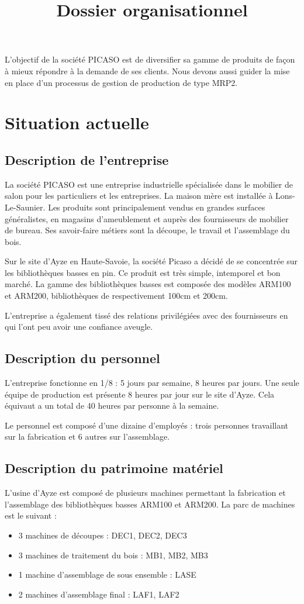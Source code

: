 \documentclass[a4paper]{../TPInsa}
\title{Dossier organisationnel}
\begin{document}
	\pageTitre
	\tableMatieres

		L'objectif de la société PICASO est de diversifier sa gamme de produits de façon à mieux répondre à la demande de ses clients. Nous devons aussi guider la mise en place d'un processus de gestion de production de type MRP2.	
	
	\section{Situation actuelle}
	
	\subsection{Description de l'entreprise}
	
	La société PICASO est une entreprise industrielle spécialisée dans le mobilier de salon pour les particuliers et les entreprises. La maison mère est installée à Lons-Le-Saunier. Les produits sont principalement vendus en grandes surfaces généralistes, en magasins d'ameublement et auprès des fournisseurs de mobilier de bureau. Ses savoir-faire métiers sont la découpe, le travail et l'assemblage du bois.
	
	Sur le site d'Ayze en Haute-Savoie, la société Picaso a décidé de se concentrée sur les bibliothèques basses en pin. Ce produit est très simple, intemporel et bon marché. La gamme des bibliothèques basses est composée des modèles ARM100 et ARM200, bibliothèques de respectivement 100cm et 200cm.  
	
	
	L'entreprise a également tissé des relations privilégiées avec des fournisseurs en qui l'ont peu avoir une confiance aveugle. 
	
	\subsection{Description du personnel}
	L'entreprise fonctionne en 1/8 : 5 jours par semaine, 8 heures par jours. Une seule équipe de production est présente 8 heures par jour sur le site d'Ayze. Cela équivaut a un total de 40 heures par personne à la semaine. 
	
	Le personnel est composé d'une dizaine d'employés : trois personnes travaillant sur la fabrication et 6 autres sur l'assemblage. 
	\subsection{Description du patrimoine matériel}
	L'usine d'Ayze est composé de plusieurs machines permettant la fabrication et l'assemblage des bibliothèques basses ARM100 et ARM200. 
	La parc de machines est le suivant :
	\begin{itemize}
	\item 3 machines de découpes : DEC1, DEC2, DEC3
	\item 3 machines de traitement du bois : MB1, MB2, MB3
	\item 1 machine d'assemblage de sous ensemble : LASE
	\item 2 machines d'assemblage final : LAF1, LAF2
	\end{itemize}
	
\end{document}
